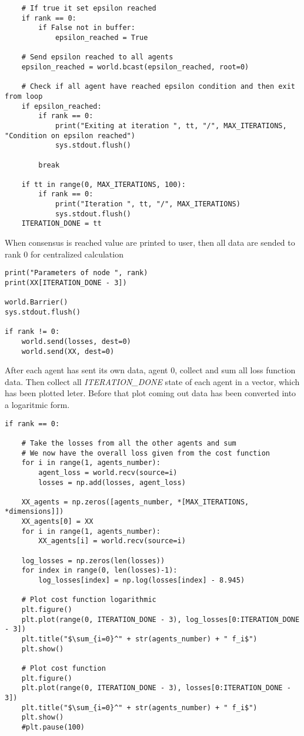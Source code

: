 \documentclass[a4paper,11pt,oneside]{book}
\begin{document}
\begin{lstlisting}
    # If true it set epsilon reached
    if rank == 0:
        if False not in buffer:
            epsilon_reached = True

    # Send epsilon reached to all agents
    epsilon_reached = world.bcast(epsilon_reached, root=0)

    # Check if all agent have reached epsilon condition and then exit from loop
    if epsilon_reached:
        if rank == 0:
            print("Exiting at iteration ", tt, "/", MAX_ITERATIONS, "Condition on epsilon reached")
            sys.stdout.flush()

        break

    if tt in range(0, MAX_ITERATIONS, 100):
        if rank == 0:
            print("Iteration ", tt, "/", MAX_ITERATIONS)
            sys.stdout.flush()
    ITERATION_DONE = tt
\end{lstlisting}

When consensus is reached value are printed to user, then all data are sended to rank 0 for centralized calculation

\begin{lstlisting}
print("Parameters of node ", rank)
print(XX[ITERATION_DONE - 3])

world.Barrier()
sys.stdout.flush()

if rank != 0:
    world.send(losses, dest=0)
    world.send(XX, dest=0)
\end{lstlisting}

After each agent has sent its own data, agent 0, collect and sum all loss function data. Then collect all \textit{ITERATION\_DONE} state of each
agent in a vector, which has been plotted leter. Before that plot coming out data has been converted into a logaritmic form.

\begin{lstlisting}
if rank == 0:

    # Take the losses from all the other agents and sum
    # We now have the overall loss given from the cost function
    for i in range(1, agents_number):
        agent_loss = world.recv(source=i)
        losses = np.add(losses, agent_loss)

    XX_agents = np.zeros([agents_number, *[MAX_ITERATIONS, *dimensions]])
    XX_agents[0] = XX
    for i in range(1, agents_number):
        XX_agents[i] = world.recv(source=i)

    log_losses = np.zeros(len(losses))
    for index in range(0, len(losses)-1):
        log_losses[index] = np.log(losses[index] - 8.945)

    # Plot cost function logarithmic
    plt.figure()
    plt.plot(range(0, ITERATION_DONE - 3), log_losses[0:ITERATION_DONE - 3])
    plt.title("$\sum_{i=0}^" + str(agents_number) + " f_i$")
    plt.show()

    # Plot cost function
    plt.figure()
    plt.plot(range(0, ITERATION_DONE - 3), losses[0:ITERATION_DONE - 3])
    plt.title("$\sum_{i=0}^" + str(agents_number) + " f_i$")
    plt.show()
    #plt.pause(100)
\end{lstlisting}
\end{document}
